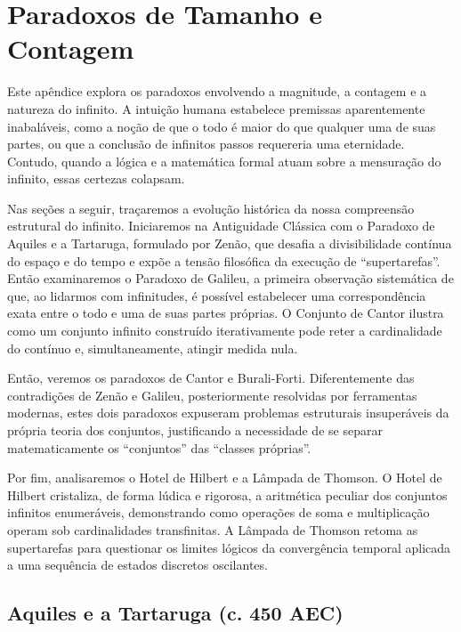 \chapter{Paradoxos de Tamanho e Contagem}
\label{chap:apendiceTamanhoContagem}

Este apêndice explora os paradoxos envolvendo a magnitude, a contagem e a natureza do infinito. A intuição humana estabelece premissas aparentemente inabaláveis, como a noção de que o todo é maior do que qualquer uma de suas partes, ou que a conclusão de infinitos passos requereria uma eternidade. Contudo, quando a lógica e a matemática formal atuam sobre a mensuração do infinito, essas certezas colapsam.

Nas seções a seguir, traçaremos a evolução histórica da nossa compreensão estrutural do infinito. Iniciaremos na Antiguidade Clássica com o Paradoxo de Aquiles e a Tartaruga, formulado por Zenão, que desafia a divisibilidade contínua do espaço e do tempo e expõe a tensão filosófica da execução de ``supertarefas''. Então examinaremos o Paradoxo de Galileu, a primeira observação sistemática de que, ao lidarmos com infinitudes, é possível estabelecer uma correspondência exata entre o todo e uma de suas partes próprias. O Conjunto de Cantor ilustra como um conjunto infinito construído iterativamente pode reter a cardinalidade do contínuo e, simultaneamente, atingir medida nula.

Então, veremos os paradoxos de Cantor e Burali-Forti. Diferentemente das contradições de Zenão e Galileu, posteriormente resolvidas por ferramentas modernas, estes dois paradoxos expuseram problemas estruturais insuperáveis da própria teoria dos conjuntos, justificando a necessidade de se separar matematicamente os ``conjuntos'' das ``classes próprias''.

Por fim, analisaremos o Hotel de Hilbert e a Lâmpada de Thomson. O Hotel de Hilbert cristaliza, de forma lúdica e rigorosa, a aritmética peculiar dos conjuntos infinitos enumeráveis, demonstrando como operações de soma e multiplicação operam sob cardinalidades transfinitas. A Lâmpada de Thomson retoma as supertarefas para questionar os limites lógicos da convergência temporal aplicada a uma sequência de estados discretos oscilantes.

\section{Aquiles e a Tartaruga (c. 450 AEC)}
\label{sec:aquiles_tartaruga}

